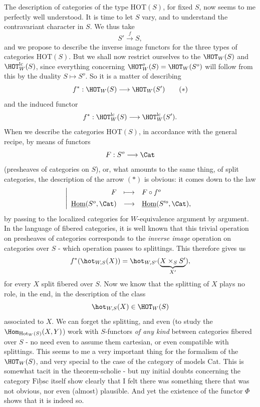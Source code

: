 The description of categories of the type HOT$(S)$, for fixed $S$, now seems to me perfectly well understood. It is time to let $S$ vary, and to understand the contravariant character in $S$. We thus take
\[S' \xrightarrow{f} S,\]
and we propose to describe the inverse image functors for the three types of categories HOT$(S)$. But we shall now restrict ourselves to the $\HOT_W(S)$ and $\HOT^{\mathrm{lc}}_W(S)$, since everything concerning $\HOT^o_W(S) = \HOT_W(S^o)$ will follow from this by the duality $S \longmapsto S^o$. So it is a matter of describing
\[f^* : \HOT_W(S) \longrightarrow \HOT_W(S') \tag*{$(*)$}\]
and the induced functor
\[f^* : \HOT^{\mathrm{lc}}_W(S) \longrightarrow \HOT^{\mathrm{lc}}_W(S').\]
When we describe the categories HOT$(S)$, in accordance with the general recipe, by means of functors
\[F : S^o \longrightarrow \Cat\]
(presheaves of categories on $S$), or, what amounts to the same thing, of split categories, the description of the arrow $(*)$ is obvious: it comes down to the law
\[\left|\begin{array}{rcl}
F & \longmapsto & F \circ f^o \\[1ex]
\underline{\mathrm{Hom}}(S^o, \Cat) & \longrightarrow & \underline{\mathrm{Hom}}(S'^o, \Cat),
\end{array}\right.\]
by passing to the localized categories for $W$-equivalence argument by argument. In the language of fibered categories, it is well known that this trivial operation on presheaves of categories corresponds to the \textit{inverse image} operation on categories over $S$ - which operation passes to splittings. This therefore gives us
\[f^*(\hot_{W,S}(X)) = \hot_{W,S'}(\underbrace{X \times_S S'}_{X'}),\]
for every $X$ split fibered over $S$. Now we know that the splitting of $X$ plays no role, in the end, in the description of the class
\[\hot_{W,S}(X) \in \HOT_W(S)\]
associated to $X$. We can forget the splitting, and even (to study the $\Hom_{\mathrm{Hot}_W(S)}(X, Y)$) work with $S$-functors \textit{of any kind} between categories fibered over $S$ - no need even to assume them cartesian, or even compatible with splittings. This seems to me a very important thing for the formalism of the $\HOT_W(S)$, and very special to the case of the category of models Cat. This is somewhat tacit in the theorem-scholie - but my initial doubts concerning the category $\underline{\mathrm{Fibsc}}$ itself show clearly that I felt there was something there that was not obvious, nor even (almost) plausible. And yet the existence of the functor $\Phi$ shows that it is indeed so.

